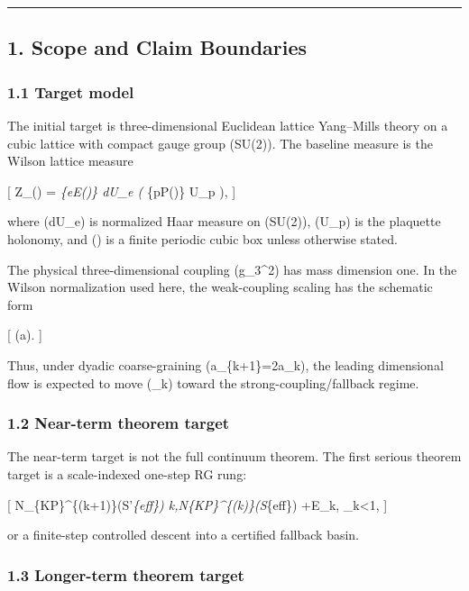 \documentclass[
]{article}
\begin{document}
\begin{center}\rule{0.5\linewidth}{0.5pt}\end{center}

\subsection{1. Scope and Claim
Boundaries}\label{scope-and-claim-boundaries}

\subsubsection{1.1 Target model}\label{target-model}

The initial target is three-dimensional Euclidean lattice Yang--Mills
theory on a cubic lattice with compact gauge group (SU(2)). The baseline
measure is the Wilson lattice measure

{[} Z\_\Lambda(\beta) = \int \prod\emph{\{e\in E(\Lambda)\} dU\_e
\exp\left( \sum}\{p\in P(\Lambda)\}
 U\_p \right), {]}

where (dU\_e) is normalized Haar measure on (SU(2)), (U\_p) is the
plaquette holonomy, and (\Lambda) is a finite periodic cubic box unless
otherwise stated.

The physical three-dimensional coupling (g\_3\^{}2) has mass dimension
one. In the Wilson normalization used here, the weak-coupling scaling
has the schematic form

{[} \beta(a)\asymp {}. {]}

Thus, under dyadic coarse-graining (a\_\{k+1\}=2a\_k), the leading
dimensional flow is expected to move (\beta\_k) toward the
strong-coupling/fallback regime.

\subsubsection{1.2 Near-term theorem
target}\label{near-term-theorem-target}

The near-term target is not the full continuum theorem. The first
serious theorem target is a scale-indexed one-step RG rung:

{[} \mathcal N\_\{\rm KP\}\^{}\{(k+1)\}(S'\emph{\{\rm eff\}) \le
\Theta\emph{k,\mathcal N}\{\rm KP\}\^{}\{(k)\}(S}\{\rm eff\}) +E\_k,
\qquad \Theta\_k\textless1, {]}

or a finite-step controlled descent into a certified fallback basin.

\subsubsection{1.3 Longer-term theorem
target}\label{longer-term-theorem-target}
\end{document}
